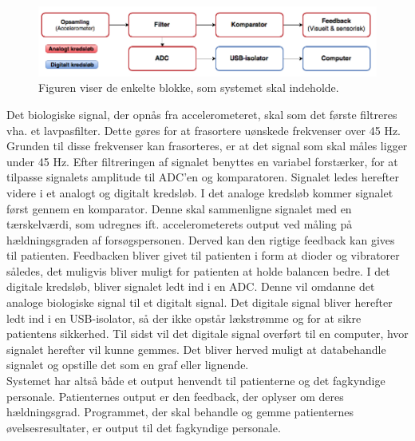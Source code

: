 \begin{figure}[H]
	\centering
	\includegraphics[scale=0.5]{figures/cProblemloesning/Blokdiagram.PNG}
	\caption{Figuren viser de enkelte blokke, som systemet skal indeholde.}
	\label{kravblok}
\end{figure}
Det biologiske signal, der opnås fra accelerometeret, skal som det første filtreres vha. et lavpasfilter. Dette gøres for at frasortere uønskede frekvenser  over 45 Hz. Grunden til disse frekvenser kan frasorteres, er at det signal som skal måles ligger under 45 Hz. Efter filtreringen af signalet benyttes en variabel forstærker, for at tilpasse signalets amplitude til ADC’en og komparatoren. Signalet ledes herefter videre i et analogt og digitalt kredsløb. I det analoge kredsløb kommer signalet først gennem en komparator. Denne skal sammenligne signalet med en tærskelværdi, som udregnes ift. accelerometerets output ved måling på hældningsgraden af forsøgspersonen. Derved kan den rigtige feedback kan gives til patienten. Feedbacken bliver givet til patienten i form at dioder og vibratorer således, det muligvis bliver muligt for patienten at holde balancen bedre. I det digitale kredsløb, bliver signalet ledt ind i en ADC. Denne vil omdanne det analoge biologiske signal til et digitalt signal. Det digitale signal bliver herefter ledt ind i en USB-isolator, så der ikke opstår lækstrømme og for at sikre patientens sikkerhed. Til sidst vil det digitale signal overført til en computer, hvor signalet herefter vil kunne gemmes. Det bliver herved muligt at databehandle signalet og opstille det som en graf eller lignende. \\
Systemet har altså både et output henvendt til patienterne og det fagkyndige personale. Patienternes output er den feedback, der oplyser om deres hældningsgrad. Programmet, der skal behandle og gemme patienternes øvelsesresultater, er output til det fagkyndige personale. 



